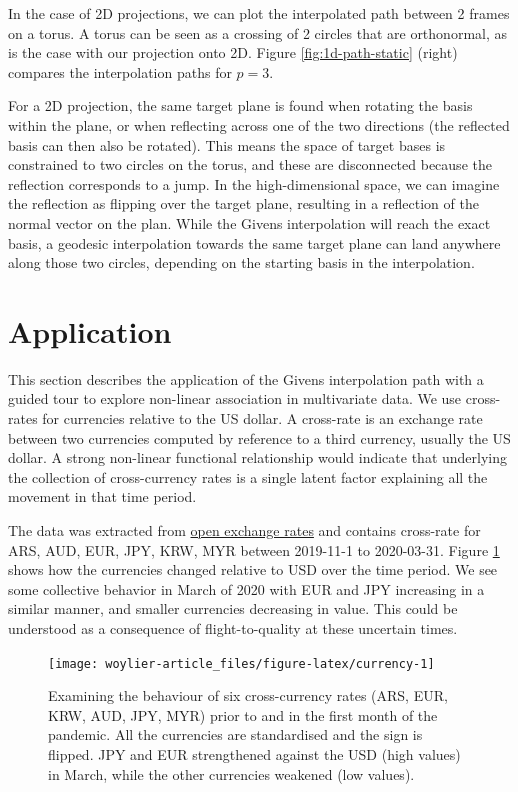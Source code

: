 In the case of 2D projections, we can plot the interpolated path between 2 frames on a torus. A torus can be seen as a crossing of 2 circles that are orthonormal, as is the case with our projection onto 2D. Figure \ref{fig:1d-path-static} (right) compares the interpolation paths for \(p=3\).

For a 2D projection, the same target plane is found when rotating the basis within the plane, or when reflecting across one of the two directions (the reflected basis can then also be rotated). This means the space of target bases is constrained to two circles on the torus, and these are disconnected because the reflection corresponds to a jump. In the high-dimensional space, we can imagine the reflection as flipping over the target plane, resulting in a reflection of the normal vector on the plan.
While the Givens interpolation will reach the exact basis, a geodesic interpolation towards the same target plane can land anywhere along those two circles, depending on the starting basis in the interpolation.

\hypertarget{application}{%
\section{Application}\label{application}}

This section describes the application of the Givens interpolation path with a guided tour to explore non-linear association in multivariate data. We use cross-rates for currencies relative to the US dollar. A cross-rate is an exchange rate between two currencies computed by reference to a third currency, usually the US dollar. A strong non-linear functional relationship would indicate that underlying the collection of cross-currency rates is a single latent factor explaining all the movement in that time period.

The data was extracted from \href{https://openexchangerates.org}{open exchange rates} and contains cross-rate for ARS, AUD, EUR, JPY, KRW, MYR between 2019-11-1 to 2020-03-31. Figure \ref{fig:currency} shows how the currencies changed relative to USD over the time period. We see some collective behavior in March of 2020 with EUR and JPY increasing in a similar manner, and smaller currencies decreasing in value. This could be understood as a consequence of flight-to-quality at these uncertain times.

\begin{figure}
\texttt{[image: woylier-article\_files/figure-latex/currency-1]} \caption{Examining the behaviour of six cross-currency rates (ARS, EUR, KRW, AUD, JPY, MYR) prior to and in the first month of the pandemic. All the currencies are standardised and the sign is flipped. JPY and EUR strengthened against the USD (high values) in March, while the other currencies weakened (low values).}\label{fig:currency}
\end{figure}

